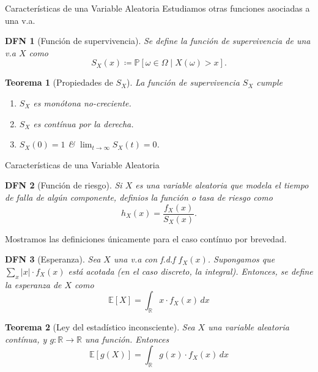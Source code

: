 \documentclass[a4paper]{article}
\newtheorem{definition}{DFN}
\theoremstyle{mytheoremstyle}
\newtheorem{theorem}{Teorema}
\newtheorem*{obs}{Obs}
\newcommand{\IP}{\mathbb{P}}
\newcommand{\R}{\mathbb{R}}
\newcommand{\E}{\mathbb{E}}
\newcommand{\1}{\mathds{1}}
\begin{document}
\begin{multicols*}{3}
\begin{roundbox}{Características de una Variable Aleatoria}
Estudiamos otras funciones asociadas a una v.a.
\begin{definition}[Función de supervivencia] 
    Se define la función de supervivencia de una v.a $X$ como 
    \[
        S_X (x) \coloneqq \IP[\omega \in \Omega \mid X(\omega) > x] .
    \]
\end{definition}

\begin{theorem}[Propiedades de $S_X$]
    La función de supervivencia $S_X$ cumple 
    \begin{enumerate}
        \item $S_X$ es monótona no-creciente. 
        \item $S_X$ es contínua por la derecha. 
        \item $S_X(0) = 1$ \& $\lim_{t \to \infty} S_X(t) = 0$. 
    \end{enumerate}
\end{theorem}
\end{roundbox}

\columnbreak

\begin{roundbox}{Características de una Variable Aleatoria}

\begin{definition}[Función de riesgo] 
    Si $X$ es una variable aleatoria que modela el tiempo de falla de algún componente, definios la función o tasa de riesgo como 
    \[
        h_X(x) = \frac{f_X (x)}{S_X(x)}.  
    \]
\end{definition}

Mostramos las definiciones únicamente para el caso contínuo por brevedad. 

\begin{definition}[Esperanza] 
    Sea $X$ una v.a con f.d.f $f_X(x)$. Supongamos que $\sum_x |x| \cdot f_X(x)$ está acotada (en el caso discreto, la integral). Entonces, se define la esperanza de $X$ como 
    \[
        \E[X] = \int_{\R} x \cdot f_X(x) \, dx
    \]
\end{definition}

\begin{theorem}[Ley del estadístico inconsciente]
    Sea $X$ una variable aleatoria contínua, y $g:\R\to\R$ una función. Entonces
    \[
        \E[g(X)] = \int_\R g(x) \cdot f_X(x) \, dx 
    \]
\end{theorem}


\end{roundbox}
\end{multicols*}
\end{document}
